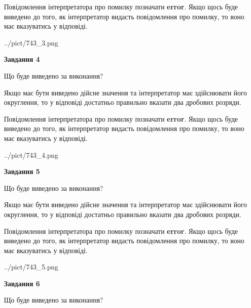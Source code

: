 \documentclass[12pt, ukrainian]{article}
\begin{document}
{\begin {Large}
Повідомлення інтерпретатора про помилку позначати \textbf{error}.
Якщо щось буде виведено до того, як інтерпретатор видасть повідомлення про помилку, 
то воно має вказуватись у відповіді. \par

\begin{center}
	{../pict/743_3.png}
\end{center}
\newpage

{\begin {center}\textbf{Завдання 4}\end {center}}\par
Що буде виведено за виконання? \par

Якщо має бути виведено дійсне значення та інтерпретатор має здійснювати його округлення, 
то у відповіді достатньо правильно вказати два дробових розряди.

Повідомлення інтерпретатора про помилку позначати \textbf{error}.
Якщо щось буде виведено до того, як інтерпретатор видасть повідомлення про помилку, 
то воно має вказуватись у відповіді. \par

\begin{center}
	{../pict/743_4.png}
\end{center}
\newpage

{\begin {center}\textbf{Завдання 5}\end {center}}\par
Що буде виведено за виконання? \par

Якщо має бути виведено дійсне значення та інтерпретатор має здійснювати його округлення, 
то у відповіді достатньо правильно вказати два дробових розряди.

Повідомлення інтерпретатора про помилку позначати \textbf{error}.
Якщо щось буде виведено до того, як інтерпретатор видасть повідомлення про помилку, 
то воно має вказуватись у відповіді. \par

\begin{center}
	{../pict/743_5.png}
\end{center}
\newpage

{\begin {center}\textbf{Завдання 6}\end {center}}\par
Що буде виведено за виконання? \par


\end{Large}}
\end{document}
